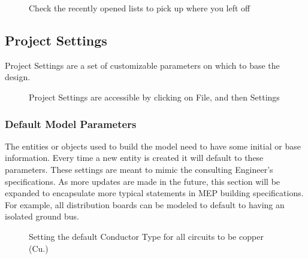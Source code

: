 \documentclass[letterpaper,10pt,english]{sphinxmanual}
\begin{document}
\begin{figure}[H]
\centering
\capstart

\noindent{}
\caption{Check the recently opened lists to pick up where you left off}\label{\detokenize{docs/userguide/index-user_guide:id22}}\end{figure}


\subsection{Project Settings}
\label{\detokenize{docs/userguide/index-user_guide:project-settings}}\label{\detokenize{docs/userguide/index-user_guide:id3}}
Project Settings are a set of customizable parameters on which to base the design.

\begin{figure}[H]
\centering
\capstart

\noindent{}
\caption{Project Settings are accessible by clicking on File, and then Settings}\label{\detokenize{docs/userguide/index-user_guide:id23}}\end{figure}


\subsubsection{Default Model Parameters}
\label{\detokenize{docs/userguide/projectsettings/defaultmodelparameters/index-default_model_parameters:default-model-parameters}}\label{\detokenize{docs/userguide/projectsettings/defaultmodelparameters/index-default_model_parameters:id1}}\label{\detokenize{docs/userguide/projectsettings/defaultmodelparameters/index-default_model_parameters::doc}}
The entities or objects used to build the model need to have some initial or base information.  Every time a new entity is created it will default to these parameters.  These settings are meant to mimic the consulting Engineer’s specifications.  As more updates are made in the future, this section will be expanded to encapsulate more typical statements in MEP building specifications.  For example, all distribution boards can be modeled to default to having an isolated ground bus.

\begin{figure}[H]
\centering
\capstart

\noindent{}
\caption{Setting the default Conductor Type for all circuits to be copper (Cu.)}\label{\detokenize{docs/userguide/projectsettings/defaultmodelparameters/index-default_model_parameters:id2}}\end{figure}
\end{document}
